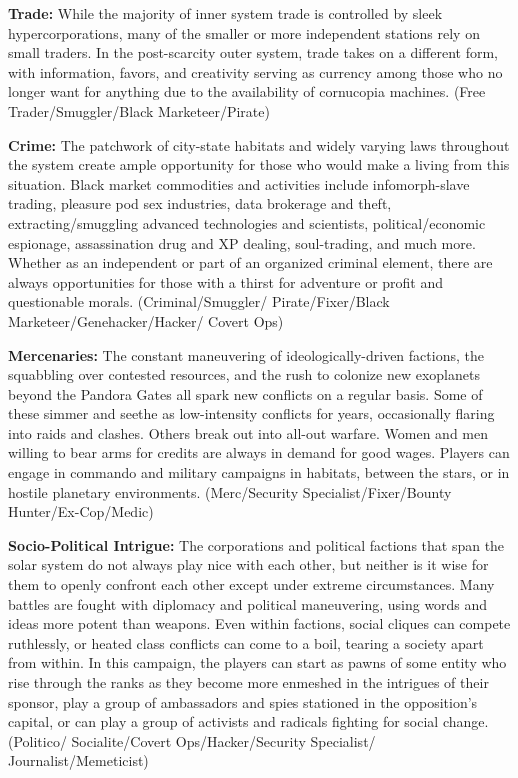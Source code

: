\textbf{Trade:} While the majority of inner system trade is 
controlled by sleek hypercorporations, many of the 
smaller or more independent stations rely on small 
traders. In the post-scarcity outer system, trade takes 
on a different form, with information, favors, and 
creativity serving as currency among those who no 
longer want for anything due to the availability of 
cornucopia machines. (Free Trader/Smuggler/Black 
Marketeer/Pirate)

\textbf{Crime:} The patchwork of city-state habitats and 
widely varying laws throughout the system create 
ample opportunity for those who would make a 
living from this situation. Black market commodities
and activities include infomorph-slave trading,
pleasure pod sex industries, data brokerage and 
theft, extracting/smuggling advanced technologies 
and scientists, political/economic espionage, assassination
drug and XP dealing, soul-trading, and
much more. Whether as an independent or part of 
an organized criminal element, there are always opportunities
for those with a thirst for adventure or
profit and questionable morals. (Criminal/Smuggler/
Pirate/Fixer/Black Marketeer/Genehacker/Hacker/
Covert Ops)

\textbf{Mercenaries:} The constant maneuvering of 
ideologically-driven factions, the squabbling over 
contested resources, and the rush to colonize new 
exoplanets beyond the Pandora Gates all spark new 
conflicts on a regular basis. Some of these simmer 
and seethe as low-intensity conflicts for years, occasionally
flaring into raids and clashes. Others break
out into all-out warfare. Women and men willing 
to bear arms for credits are always in demand for 
good wages. Players can engage in commando and 
military campaigns in habitats, between the stars, or 
in hostile planetary environments. (Merc/Security 
Specialist/Fixer/Bounty Hunter/Ex-Cop/Medic)

\textbf{Socio-Political Intrigue:} The corporations and 
political factions that span the solar system do not 
always play nice with each other, but neither is it 
wise for them to openly confront each other except 
under extreme circumstances. Many battles are 
fought with diplomacy and political maneuvering, 
using words and ideas more potent than weapons. 
Even within factions, social cliques can compete 
ruthlessly, or heated class conflicts can come to 
a boil, tearing a society apart from within. In this 
campaign, the players can start as pawns of some 
entity who rise through the ranks as they become 
more enmeshed in the intrigues of their sponsor, play 
a group of ambassadors and spies stationed in the 
opposition's capital, or can play a group of activists
and radicals fighting for social change. (Politico/
Socialite/Covert Ops/Hacker/Security Specialist/
Journalist/Memeticist)

